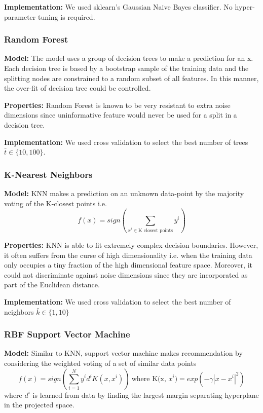 \documentclass{article}
\begin{document}
\textbf{Implementation:}
We used sklearn's Gaussian Naive Bayes classifier. No hyper-parameter tuning is required.

\subsubsection*{Random Forest}
\textbf{Model:}
The model uses a group of decision trees to make a prediction for an x. Each decision tree is based by a bootstrap sample of the training data and the splitting nodes are constrained to a random subset of all features. In this manner, the over-fit of decision tree could be controlled.

\textbf{Properties:}
Random Forest is known to be very resistant to extra noise dimensions since uninformative feature would never be used for a split in a decision tree.

\textbf{Implementation:}
We used cross validation to select the best number of trees $\bar{t} \in \{10, 100\}$.

\subsubsection*{K-Nearest Neighbors}
\textbf{Model:}
KNN makes a prediction on an unknown data-point by the majority voting of the K-closest points i.e. $$f(x) = sign(\sum_{x^i \in \text{K closest points}} y^i) $$

\textbf{Properties:}
KNN is able to fit extremely complex decision boundaries. However, it often suffers from the curse of high dimensionality i.e. when the training data only occupies a tiny fraction of the high dimensional feature space. Moreover, it could not discriminate against noise dimensions since they are incorporated as part of the Euclidean distance.

\textbf{Implementation:}
We used cross validation to select the best number of neighbors $\bar{k} \in \{1, 10\}$




\subsubsection*{RBF Support Vector Machine}
\textbf{Model:}
Similar to KNN, support vector machine makes recommendation by considering the weighted voting of a set of similar data points
$$f(x) = sign(\sum_{i=1}^{N} y^i d^i K(x, x^i))\ \text{where K(x, $x^i$)} = exp(-\gamma|x - x^i|^2)$$
where $d^i$ is learned from data by finding the largest margin separating hyperplane in the projected space.
\end{document}

